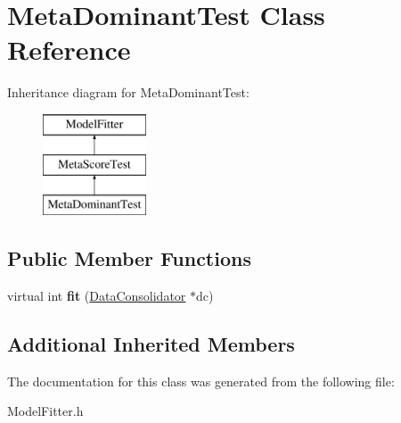 \hypertarget{classMetaDominantTest}{\section{Meta\-Dominant\-Test Class Reference}
\label{classMetaDominantTest}
}
Inheritance diagram for Meta\-Dominant\-Test\-:\begin{figure}[H]
\begin{center}
\leavevmode
\includegraphics[height=3.000000cm]{classMetaDominantTest}
\end{center}
\end{figure}
\subsection*{Public Member Functions}
\begin{DoxyCompactItemize}
\item 
\hypertarget{classMetaDominantTest_a12c7e00e7734172c746ddce233bb3835}{virtual int {\bfseries fit} (\hyperlink{classDataConsolidator}{Data\-Consolidator} $\ast$dc)}\label{classMetaDominantTest_a12c7e00e7734172c746ddce233bb3835}

\end{DoxyCompactItemize}
\subsection*{Additional Inherited Members}


The documentation for this class was generated from the following file\-:\begin{DoxyCompactItemize}
\item 
Model\-Fitter.\-h\end{DoxyCompactItemize}
